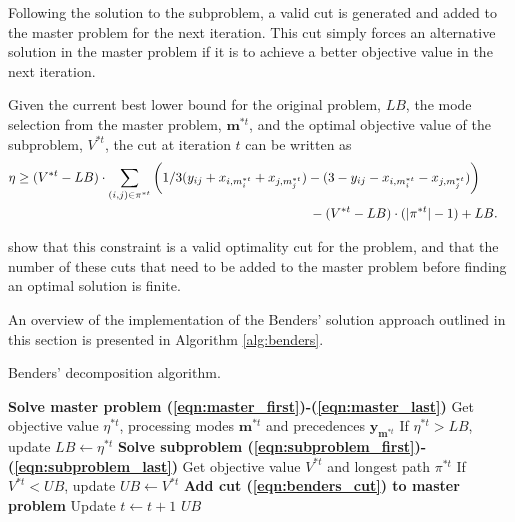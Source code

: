 \documentclass[a4paper,abstracton]{scrartcl}
\begin{document}
Following the solution to the subproblem, a valid cut is generated and added to the master problem for the next iteration. This cut simply forces an alternative solution in the master problem if it is to achieve a better objective value in the next iteration. 

Given the current best lower bound for the original problem, $LB$, the mode selection from the master problem, $\bm{m}^{*t}$, and the optimal objective value of the subproblem, $V^{*t}$, the cut at iteration $t$ can be written as
\begin{align}
	& \eta \geq (V^{*t} - LB)\cdot\sum_{(i,j)\in \pi^{*t}}\bigg(1/3 (y_{ij} + x_{i,m_i^{*t}} + x_{j,m_j^{*t}}) - (3 - y_{ij} - x_{i,m_i^{*t}} - x_{j,m_j^{*t}})\bigg) & \nonumber \\
	& \hspace{8.1cm} - (V^{*t} - LB)\cdot(|\pi^{*t}|-1) + LB.\label{eqn:benders_cut}
\end{align}

\cite{balouka2021robust} show that this constraint is a valid optimality cut for the problem, and that the number of these cuts that need to be added to the master problem before finding an optimal solution is finite.

An overview of the implementation of the Benders' solution approach outlined in this section is presented in Algorithm \ref{alg:benders}.

\begin{algorithm}[h] 
\caption{Benders' decomposition algorithm.}
\begin{algorithmic}[1]
	\State \textbf{Solve master problem (\ref{eqn:master_first})-(\ref{eqn:master_last})} 
	\State \hspace{\algorithmicindent} Get objective value $\eta^{*t}$, processing modes $\bm{m}^{*t}$ and precedences $\bm{y}_{\bm{m}^{*t}}$
	\State \hspace{\algorithmicindent} If $\eta^{*t}>LB$, update $LB\leftarrow \eta^{*t}$ 
	\State \textbf{Solve subproblem (\ref{eqn:subproblem_first})-(\ref{eqn:subproblem_last})}
	\State \hspace{\algorithmicindent} Get objective value $V^{*t}$ and longest path $\pi^{*t}$
	\State \hspace{\algorithmicindent} If $V^{*t}<UB$, update $UB\leftarrow V^{*t}$
	\State \textbf{Add cut (\ref{eqn:benders_cut}) to master problem}
	\State Update $t\leftarrow t+1$
\EndWhile
\State \Return $UB$
\end{algorithmic}
\label{alg:benders}
\end{algorithm}
\end{document}
